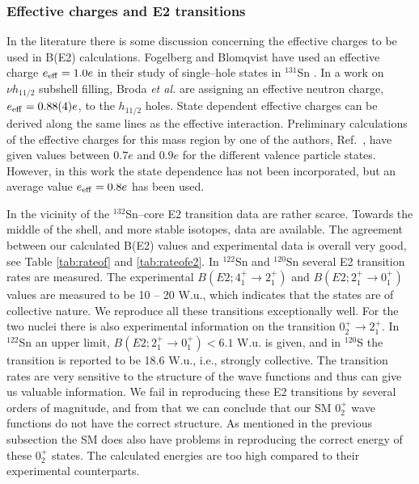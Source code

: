 \subsubsection{Effective charges and E2 transitions}

In the literature there is some discussion concerning the effective charges 
to be used in B(E2) calculations. Fogelberg and Blomqvist have used an 
effective charge $e_{\rm eff} = 1.0 e$ in their study of single--hole states 
in $^{131}$Sn \cite{bf84}. In a work on $\nu h_{11/2}$ subshell filling, 
Broda {\em et al.} \cite{brod92} are assigning an effective neutron charge, 
$e_{\rm eff} = 0.88(4)e$, to the $h_{11/2}$ holes. State dependent effective 
charges can be derived along the same lines as the effective interaction. 
Preliminary calculations of the effective charges for this mass region  
by one of the authors, Ref.\ \cite{hjor97}, have given values between 
$0.7e$ and $0.9e$ for the different valence particle states. 
However, in this work the state dependence has not been incorporated, but an 
average value $e_{\rm eff} = 0.8e$ has been used.

In the vicinity of the $^{132}$Sn--core E2 transition data are rather 
scarce. Towards the middle of the shell, and more stable isotopes, data
are available. The agreement between our calculated B(E2) values and 
experimental data is overall very good, see Table \ref{tab:rateof} and 
\ref{tab:rateofe2}. In $^{122}$Sn and $^{120}$Sn
several E2 transition rates are measured. The experimental 
$B(E2;4^+_1 \rightarrow 2^+_1)$ and $B(E2;2^+_1 \rightarrow 0^+_1)$ values
are measured to be 10 -- 20 W.u., which indicates that the states are of 
collective nature. We reproduce all these transitions exceptionally well. For 
the two nuclei there is also experimental information on the transition 
$0^+_2 \rightarrow 2_1^+$. In $^{122}$Sn an upper limit,
$B(E2;2^+_1 \rightarrow 0^+_1) < 6.1$ W.u. is given, and in $^{120}$S
the transition is reported to be 18.6 W.u., i.e., strongly collective. 
The transition rates are very sensitive to the structure of the 
wave functions and thus can give us valuable information. We fail in 
reproducing these E2 transitions by several orders of magnitude, and from 
that we can conclude that our SM $0^+_2$ wave functions do not have the 
correct structure. As mentioned in the previous subsection the SM does also 
have problems in reproducing the correct energy of these $0^+_2$ states. 
The calculated energies are too high compared to their experimental 
counterparts.

